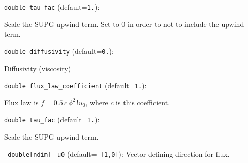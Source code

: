 \item\verb+double tau_fac+ {\rm(default=\verb|1.|)}:

Scale the SUPG upwind term. Set to 0 in order to
 not to include the upwind term. 

\item\verb+double diffusivity+ {\rm(default=\verb|0.|)}:

Diffusivity (viscosity)

\item\verb+double flux_law_coefficient+ {\rm(default=\verb|1.|)}:

Flux law is $f= 0.5\,c\, \phi^2\,!u_0$, where $c$
is this coefficient. 

\item\verb+double tau_fac+ {\rm(default=\verb|1.|)}:

Scale the SUPG upwind term. 

\item\verb+ double[ndim]+ \verb+ u0+ {\rm(default=\verb| [1,0]|)}:
 Vector defining direction for flux. 
